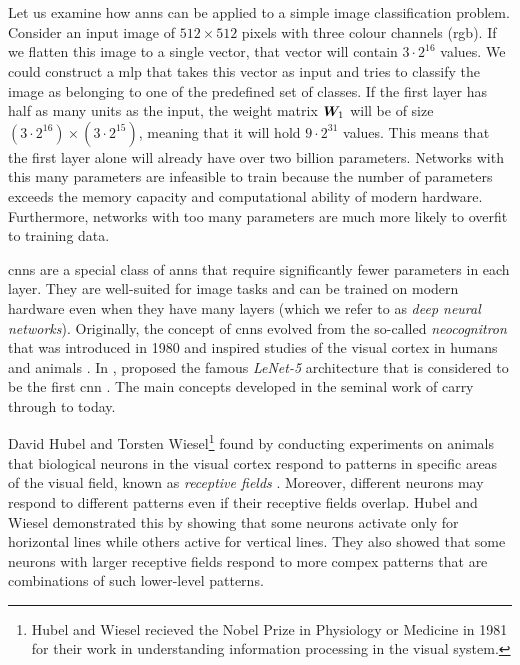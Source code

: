 \documentclass[../main.tex]{subfiles}
\begin{document}
\section{}
\label{sec:cnns}
Let us examine how \glspl{ann} can be applied to a simple image classification problem.
Consider an input image of $512 \times 512$ pixels with three colour channels (\gls{rgb}).
If we flatten this image to a single vector, that vector will contain $3 \cdot 2^{16}$ values.
We could construct a \gls{mlp} that takes this vector as input and tries to classify the image as belonging to one of the predefined set of classes.
If the first layer has half as many units as the input, the weight matrix ${\bm{W}}_1$ will be of size $(3 \cdot 2^{16}) \times (3 \cdot 2^{15})$, meaning that it will hold $9 \cdot 2^{31}$ values.
This means that the first layer alone will already have over two billion parameters.
Networks with this many parameters are infeasible to train because the number of parameters exceeds the memory capacity and computational ability of modern hardware.
Furthermore, networks with too many parameters are much more likely to overfit to training data.

\Glspl{cnn} are a special class of \glspl{ann} that require significantly fewer parameters in each layer.
They are well-suited for image tasks and can be trained on modern hardware even when they have many layers (which we refer to as \emph{deep neural networks}).
Originally, the concept of \glspl{cnn} evolved from the so-called \emph{neocognitron} that was introduced in 1980 and inspired studies of the visual cortex in humans and animals \cite{fukushima1980}.
In \citeyear{lecun1998}, \citeauthor{lecun1998} proposed the famous \emph{LeNet-5} architecture that is considered to be the first \gls{cnn} \cite{lecun1998}. 
The main concepts developed in the seminal work of \citeauthor{lecun1998} carry through to today.

David Hubel and Torsten Wiesel\footnote{Hubel and Wiesel recieved the Nobel Prize in Physiology or Medicine in 1981 for their work in understanding information processing in the visual system.} found by conducting experiments on animals that biological neurons in the visual cortex respond to patterns in specific areas of the visual field, known as \emph{receptive fields} \cite{hubel1959}.
Moreover, different neurons may respond to different patterns even if their receptive fields overlap.
Hubel and Wiesel demonstrated this by showing that some neurons activate only for horizontal lines while others active for vertical lines.
They also showed that some neurons with larger receptive fields respond to more compex patterns that are combinations of such lower-level patterns.
\end{document}
